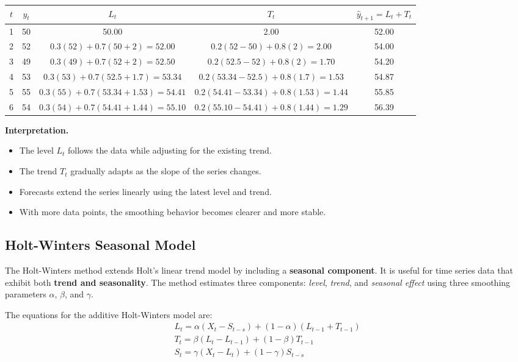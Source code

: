 \documentclass[10pt,a4paper]{article}
\begin{document}
	\begin{center}
	\begin{tabular}{c|c|c|c|c}
	\hline
	$t$ & $y_t$ & $L_t$ & $T_t$ & $\hat{y}_{t+1} = L_t + T_t$ \\
	\hline
	1 & 50 & 50.00 & 2.00 & 52.00 \\
	2 & 52 & $0.3(52) + 0.7(50+2) = 52.00$ & $0.2(52-50) + 0.8(2) = 2.00$ & 54.00 \\
	3 & 49 & $0.3(49) + 0.7(52+2) = 52.50$ & $0.2(52.5-52) + 0.8(2) = 1.70$ & 54.20 \\
	4 & 53 & $0.3(53) + 0.7(52.5+1.7) = 53.34$ & $0.2(53.34-52.5) + 0.8(1.7) = 1.53$ & 54.87 \\
	5 & 55 & $0.3(55) + 0.7(53.34+1.53) = 54.41$ & $0.2(54.41-53.34) + 0.8(1.53) = 1.44$ & 55.85 \\
	6 & 54 & $0.3(54) + 0.7(54.41+1.44) = 55.10$ & $0.2(55.10-54.41) + 0.8(1.44) = 1.29$ & 56.39 \\
	\hline
	\end{tabular}
	\end{center}
	
	\medskip
	
	\textbf{Interpretation.}
	\begin{itemize}
	\item The level $L_t$ follows the data while adjusting for the existing trend.
	\item The trend $T_t$ gradually adapts as the slope of the series changes.
	\item Forecasts extend the series linearly using the latest level and trend.
	\item With more data points, the smoothing behavior becomes clearer and more stable.
	\end{itemize}
	
	
	\subsection{Holt-Winters Seasonal Model}
	
	The Holt-Winters method extends Holt’s linear trend model by including a 
	\textbf{seasonal component}. It is useful for time series data that exhibit 
	both \textbf{trend and seasonality}. The method estimates three components: 
	\textit{level}, \textit{trend}, and \textit{seasonal effect} using three 
	smoothing parameters $\alpha$, $\beta$, and $\gamma$.
	
	The equations for the additive Holt-Winters model are:
	\begin{align*}
	L_t = \alpha (X_t - S_{t-s}) + (1-\alpha)(L_{t-1} + T_{t-1}) \\
	T_t = \beta (L_t - L_{t-1}) + (1-\beta)T_{t-1}\\
	S_t = \gamma (X_t - L_t) + (1-\gamma)S_{t-s}
	\end{align*}
	
\end{document}
